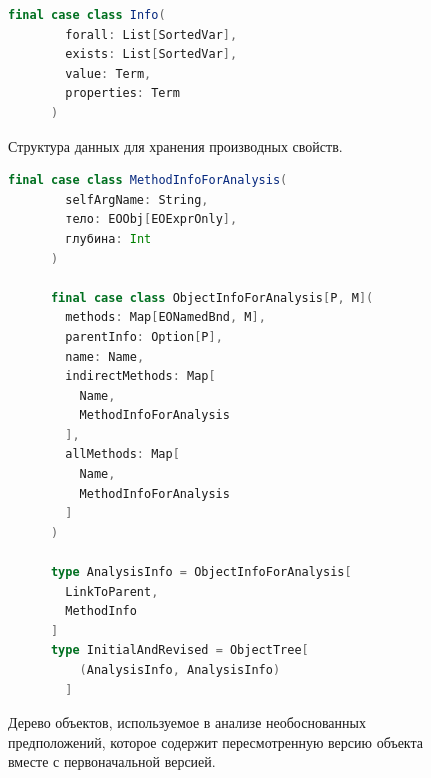 \begin{figure}
    \begin{lstlisting}[language=Scala]
      final case class Info(
        forall: List[SortedVar],
        exists: List[SortedVar],
        value: Term,
        properties: Term
      )
    \end{lstlisting}
    \caption{Структура данных для хранения производных свойств.}
    \label{fig:property_structure}
    \end{figure}
    
    \begin{figure}
    \begin{lstlisting}[language=Scala]
      final case class MethodInfoForAnalysis(
        selfArgName: String,
        тело: EOObj[EOExprOnly],
        глубина: Int
      )
    
      final case class ObjectInfoForAnalysis[P, M](
        methods: Map[EONamedBnd, M],
        parentInfo: Option[P],
        name: Name,
        indirectMethods: Map[
          Name, 
          MethodInfoForAnalysis
        ],
        allMethods: Map[
          Name, 
          MethodInfoForAnalysis
        ]
      )
    
      type AnalysisInfo = ObjectInfoForAnalysis[
        LinkToParent,
        MethodInfo
      ]
      type InitialAndRevised = ObjectTree[
          (AnalysisInfo, AnalysisInfo)
        ]
    \end{lstlisting}
    \caption{Дерево объектов, используемое в анализе необоснованных предположений, которое содержит пересмотренную версию объекта вместе с первоначальной версией.}
    \label{fig:zipwithinlined}
    \end{figure}
    